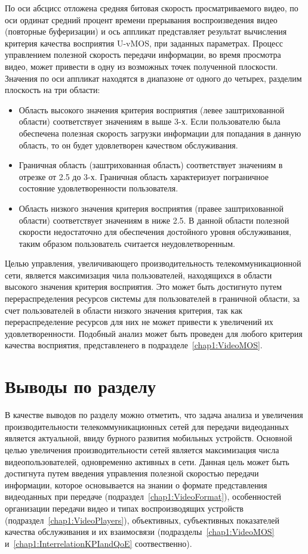 По оси абсцисс отложена средняя битовая скорость просматриваемого видео, по оси ординат средний процент времени прерывания воспроизведения видео (повторные буферизации) и ось аппликат представляет результат вычисления критерия качества восприятия U-vMOS, при заданных параметрах. Процесс управлением полезной скорость передачи информации, во время просмотра видео, может привести в одну из возможных точек полученной плоскости. Значения по оси аппликат находятся в диапазоне от одного до четырех, разделим плоскость на три области:
\begin{itemize}
  \item Область высокого значения критерия восприятия (левее заштрихованной области) соответствует значениям в выше 3-х. Если пользователю была обеспечена полезная скорость загрузки информации для попадания в данную область, то он будет удовлетворен качеством обслуживания.
  \item Граничная область (заштрихованная область) соответствует значениям в отрезке от 2.5 до 3-х. Граничная область характеризует пограничное состояние удовлетворенности пользователя.
  \item Область низкого значения критерия восприятия (правее заштрихованной области) соответствует значениям в ниже 2.5. В данной области полезной скорости недостаточно для обеспечения достойного уровня обслуживания, таким образом пользователь считается неудовлетворенным.
\end{itemize}

Целью управления, увеличивающего производительность телекоммуникационной сети, является максимизация чила пользователей, находящихся в области высокого значения критерия восприятия. Это может быть достигнуто путем перераспределения ресурсов системы для пользователей в граничной области, за счет пользователей в области низкого значения критерия, так как перераспределение ресурсов для них не может привести к увеличений их удовлетворенности. Подобный анализ может быть проведен для любого критерия качества восприятия, представленего в подразделе~\ref{chap1:VideoMOS}.

\section{Выводы по разделу}

В качестве выводов по разделу можно отметить, что задача анализа и увеличения производительности телекоммуникационных сетей для передачи видеоданных является актуальной, ввиду бурного развития мобильных устройств. Основной целью увеличения производительности сетей является максимизация числа видеопользователей, одновременно активных в сети. Данная цель может быть достигнута путем введения управления полезной скоростью передачи информации, которое основывается на знании о формате представления видеоданных при передаче (подраздел~\ref{chap1:VideoFormat}), особенностей организации передачи видео и типах воспроизводящих устройств (подраздел~\ref{chap1:VideoPlayers}), объективных, субъективных показателей качества обслуживания и их взаимосвязи (подразделы~\ref{chap1:VideoMOS} и~\ref{chap1:InterrelationKPIandQoE} соотвественно).

